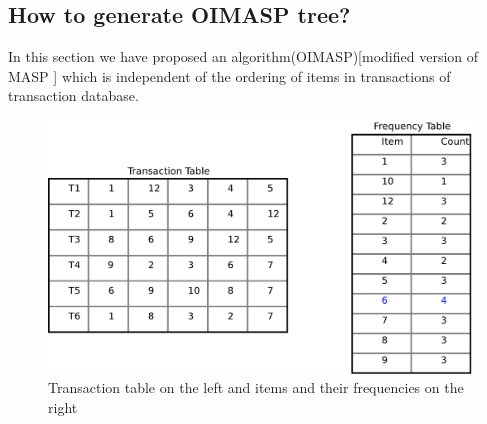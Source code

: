 \documentclass[review]{elsarticle}
\begin{document}
\subsection{How to generate OIMASP tree?}
In this section we have proposed an algorithm(OIMASP)[modified version of MASP \cite{oldmasp}] which is independent of the ordering of items in transactions of transaction database.

\begin{figure}
\begin{center}
\includegraphics[scale=0.4]{pdf/itemfreq}
\end{center}
\caption{Transaction table on the left and items and their frequencies on the right}
\label{Fig 5}
\end{figure}
\end{document}
